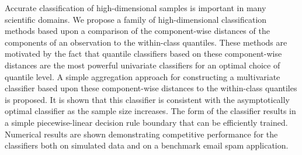 
Accurate classification of high-dimensional samples is important in many
scientific domains.  We propose a family of high-dimensional classification
methods based upon a comparison of the component-wise distances of the
components of an observation to the within-class quantiles.  These methods are
motivated by the fact that quantile classifiers based on these component-wise
distances are the most powerful univariate classifiers for an optimal choice of
quantile level.  A simple aggregation approach for constructing a multivariate
classifier based upon these component-wise distances to the within-class
quantiles is proposed.  It is shown that this classifier is consistent with the
asymptotically optimal classifier as the sample size increases.  The form of the
classifier results in a simple piecewise-linear decision rule boundary that can
be efficiently trained.  Numerical results are shown demonstrating competitive
performance for the classifiers both on simulated data and on a benchmark email
spam application.




